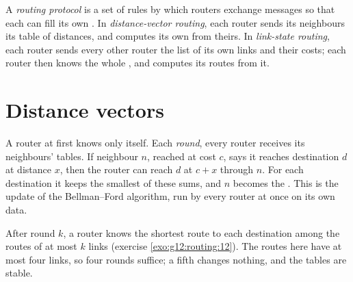 \label{out:g12:routing:costs}

\begin{definition}\label{def:g12:routing:routing-protocol}
A \emph{routing protocol} is a set of rules by which routers exchange messages so that each
can fill its own . In \emph{distance-vector routing}, each router sends
its neighbours its table of distances, and computes its own from theirs. In \emph{link-state
routing}, each router sends every other router the list of its own links and their costs;
each router then knows the whole , and computes its routes from it.
\end{definition}

\section{Distance vectors}\label{sec:g12:routing:dv}

A router at first knows only itself. Each \emph{round}, every router receives its neighbours' tables. If neighbour
$n$, reached at cost $c$, says it reaches destination $d$ at distance $x$, then the router can reach $d$ at $c + x$
through $n$. For each destination it keeps the smallest of these sums, and $n$ becomes the . This is the
update of the Bellman--Ford algorithm, run by every router at once on its own data.

\label{lst:g12:routing:dv}

\label{out:g12:routing:dv}

After round $k$, a router knows the shortest route to each destination among the routes of at most $k$ links
(exercise \ref{exo:g12:routing:12}). The routes here have at most four links, so four rounds suffice; a fifth changes
nothing, and the tables are stable.


